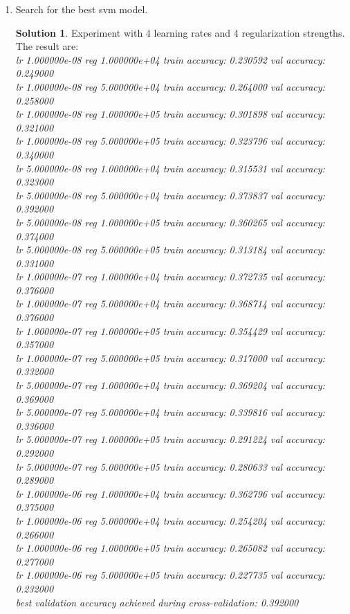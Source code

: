 \documentclass[]{book}
\theoremstyle{definition}
\newtheorem*{soln}{Solution}
\begin{document}
\begin{enumerate}
	
	\item Search for the best svm model.
	\begin{soln}
		Experiment with 4 learning rates and 4 regularization strengths. The result are:\\
		\textit{lr 1.000000e-08 reg 1.000000e+04 train accuracy: 0.230592 val accuracy: 0.249000\\
			lr 1.000000e-08 reg 5.000000e+04 train accuracy: 0.264000 val accuracy: 0.258000\\
			lr 1.000000e-08 reg 1.000000e+05 train accuracy: 0.301898 val accuracy: 0.321000\\
			lr 1.000000e-08 reg 5.000000e+05 train accuracy: 0.323796 val accuracy: 0.340000\\
			lr 5.000000e-08 reg 1.000000e+04 train accuracy: 0.315531 val accuracy: 0.323000\\
			lr 5.000000e-08 reg 5.000000e+04 train accuracy: 0.373837 val accuracy: 0.392000\\
			lr 5.000000e-08 reg 1.000000e+05 train accuracy: 0.360265 val accuracy: 0.374000\\
			lr 5.000000e-08 reg 5.000000e+05 train accuracy: 0.313184 val accuracy: 0.331000\\
			lr 1.000000e-07 reg 1.000000e+04 train accuracy: 0.372735 val accuracy: 0.376000\\
			lr 1.000000e-07 reg 5.000000e+04 train accuracy: 0.368714 val accuracy: 0.376000\\
			lr 1.000000e-07 reg 1.000000e+05 train accuracy: 0.354429 val accuracy: 0.357000\\
			lr 1.000000e-07 reg 5.000000e+05 train accuracy: 0.317000 val accuracy: 0.332000\\
			lr 5.000000e-07 reg 1.000000e+04 train accuracy: 0.369204 val accuracy: 0.369000\\
			lr 5.000000e-07 reg 5.000000e+04 train accuracy: 0.339816 val accuracy: 0.336000\\
			lr 5.000000e-07 reg 1.000000e+05 train accuracy: 0.291224 val accuracy: 0.292000\\
			lr 5.000000e-07 reg 5.000000e+05 train accuracy: 0.280633 val accuracy: 0.289000\\
			lr 1.000000e-06 reg 1.000000e+04 train accuracy: 0.362796 val accuracy: 0.375000\\
			lr 1.000000e-06 reg 5.000000e+04 train accuracy: 0.254204 val accuracy: 0.266000\\
			lr 1.000000e-06 reg 1.000000e+05 train accuracy: 0.265082 val accuracy: 0.277000\\
			lr 1.000000e-06 reg 5.000000e+05 train accuracy: 0.227735 val accuracy: 0.232000\\
			best validation accuracy achieved during cross-validation: 0.392000}
		

\end{soln}
\end{enumerate}
\end{document}
